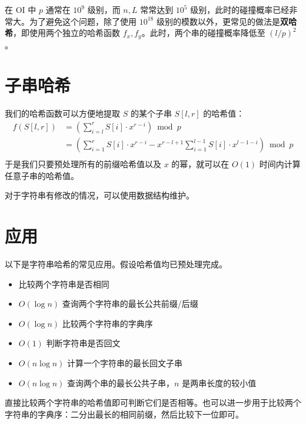 在 OI 中 $p$ 通常在 $10^9$ 级别，而 $n,L$ 常常达到 $10^5$ 级别，此时的碰撞概率已经非常大。为了避免这个问题，除了使用 $10^{18}$ 级别的模数以外，更常见的做法是\textbf{双哈希}，即使用两个独立的哈希函数 $f_x,f_y$。此时，两个串的碰撞概率降低至 $(l/p)^2$。

\section{子串哈希}

我们的哈希函数可以方便地提取 $S$ 的某个子串 $S[l,r]$ 的哈希值：
$$
\begin{aligned}
f(S[l,r])&=\left(\sum_{i=l}^r S[i]\cdot x^{r-i}\right) \bmod p\\
&=\left(\sum_{i=1}^{r} S[i]\cdot x^{r-i}-x^{r-l+1}\sum_{i=1}^{l-1} S[i]\cdot x^{l-1-i}\right) \bmod p\\
\end{aligned}
$$
于是我们只要预处理所有的前缀哈希值以及 $x$ 的幂，就可以在 $O(1)$ 时间内计算任意子串的哈希值。

对于字符串有修改的情况，可以使用数据结构维护。

\section{应用}

以下是字符串哈希的常见应用。假设哈希值均已预处理完成。

\begin{itemize}
    \item 比较两个字符串是否相同
    \item $O(\log n)$ 查询两个字符串的最长公共前缀/后缀
    \item $O(\log n)$ 比较两个字符串的字典序
    \item $O(1)$ 判断字符串是否回文
    \item $O(n\log n)$ 计算一个字符串的最长回文子串
    \item $O(n\log n)$ 查询两个串的最长公共子串，$n$ 是两串长度的较小值
\end{itemize}

直接比较两个字符串的哈希值即可判断它们是否相等。也可以进一步用于比较两个字符串的字典序：二分出最长的相同前缀，然后比较下一位即可。


